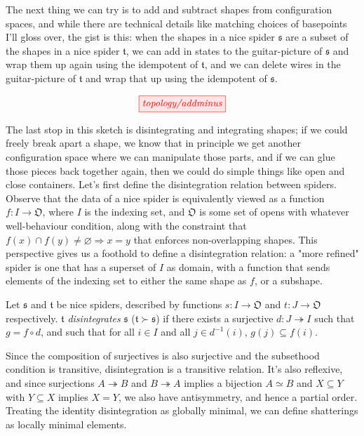 The next thing we can try is to add and subtract shapes from configuration spaces, and while there are technical details like matching choices of basepoints I'll gloss over, the gist is this: when the shapes in a nice spider $\mathfrak{s}$ are a subset of the shapes in a nice spider $\mathfrak{t}$, we can add in states to the guitar-picture of $\mathfrak{s}$ and wrap them up again using the idempotent of $\mathfrak{t}$, and we can delete wires in the guitar-picture of $\mathfrak{t}$ and wrap that up using the idempotent of $\mathfrak{s}$.

\[\tikzfig{topology/addminus}\]

The last stop in this sketch is disintegrating and integrating shapes; if we could freely break apart a shape, we know that in principle we get another configuration space where we can manipulate those parts, and if we can glue those pieces back together again, then we could do simple things like open and close containers. Let's first define the disintegration relation between spiders. Observe that the data of a nice spider is equivalently viewed as a function $f: I \rightarrow \mathfrak{O}$, where $I$ is the indexing set, and $\mathfrak{O}$ is some set of opens with whatever well-behaviour condition, along with the constraint that $f(x) \cap f(y) \neq \varnothing \Rightarrow x = y$ that enforces non-overlapping shapes. This perspective gives us a foothold to define a disintegration relation: a "more refined" spider is one that has a superset of $I$ as domain, with a function that sends elements of the indexing set to either the same shape as $f$, or a subshape.

\begin{defn}[Disintegration]
Let $\mathfrak{s}$ and $\mathfrak{t}$ be nice spiders, described by functions $s: I \rightarrow \mathfrak{O}$ and $t: J \rightarrow \mathfrak{O}$ respectively. $\mathfrak{t}$ \emph{disintegrates} $\mathfrak{s}$ ($\mathfrak{t} \succ \mathfrak{s}$) if there exists a surjective $d: J \twoheadrightarrow I$ such that $g = f \circ d$, and such that for all $i \in I$ and all $j \in d^{-1}(i)$, $g(j) \subseteq f(i)$.
\end{defn}

Since the composition of surjectives is also surjective and the subsethood condition is transitive, disintegration is a transitive relation. It's also reflexive, and since surjections $A \twoheadrightarrow B$ and $B \twoheadrightarrow A$ implies a bijection $A \simeq B$ and $X \subseteq Y$ with $Y \subseteq X$ implies $X = Y$, we also have antisymmetry, and hence a partial order. Treating the identity disintegration as globally minimal, we can define shatterings as locally minimal elements.

